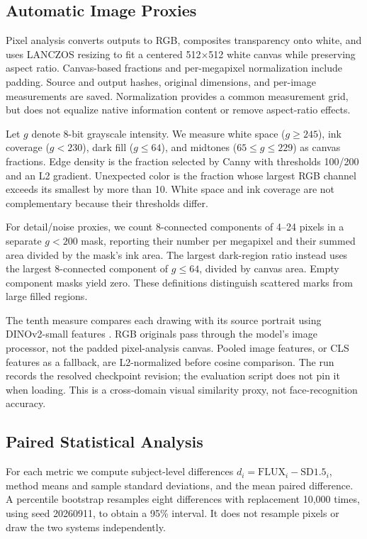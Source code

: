 \documentclass[11pt]{article}
\begin{document}
\subsection{Automatic Image Proxies}

Pixel analysis converts outputs to RGB, composites transparency onto white, and uses LANCZOS resizing to fit a centered 512$\times$512 white canvas while preserving aspect ratio. Canvas-based fractions and per-megapixel normalization include padding. Source and output hashes, original dimensions, and per-image measurements are saved. Normalization provides a common measurement grid, but does not equalize native information content or remove aspect-ratio effects.

Let $g$ denote 8-bit grayscale intensity. We measure white space ($g\ge245$), ink coverage ($g<230$), dark fill ($g\le64$), and midtones ($65\le g\le229$) as canvas fractions. Edge density is the fraction selected by Canny with thresholds 100/200 and an L2 gradient. Unexpected color is the fraction whose largest RGB channel exceeds its smallest by more than 10. White space and ink coverage are not complementary because their thresholds differ.

For detail/noise proxies, we count 8-connected components of 4--24 pixels in a separate $g<200$ mask, reporting their number per megapixel and their summed area divided by the mask's ink area. The largest dark-region ratio instead uses the largest 8-connected component of $g\le64$, divided by canvas area. Empty component masks yield zero. These definitions distinguish scattered marks from large filled regions.

The tenth measure compares each drawing with its source portrait using DINOv2-small features \citep{oquab-etal-2023-dinov2}. RGB originals pass through the model's image processor, not the padded pixel-analysis canvas. Pooled image features, or CLS features as a fallback, are L2-normalized before cosine comparison. The run records the resolved checkpoint revision; the evaluation script does not pin it when loading. This is a cross-domain visual similarity proxy, not face-recognition accuracy.

\subsection{Paired Statistical Analysis}

For each metric we compute subject-level differences $d_i=\mathrm{FLUX}_i-\mathrm{SD1.5}_i$, method means and sample standard deviations, and the mean paired difference. A percentile bootstrap resamples eight differences with replacement 10,000 times, using seed 20260911, to obtain a 95\% interval. It does not resample pixels or draw the two systems independently.
\end{document}

